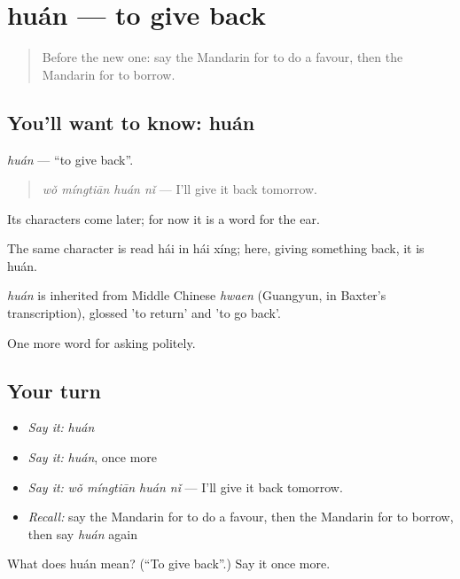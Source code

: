 \section[huán]{huán — to give back}

\label{lesson:ZH-C64-huan}



\begin{quote}
Before the new one: say the Mandarin for to do a favour, then the Mandarin for to borrow.
\end{quote}

\subsection*{You'll want to know: huán}
\emph{huán} — \textquotedblleft{}to give back\textquotedblright{}.

\begin{quote}
\emph{wǒ míngtiān huán nǐ} — I'll give it back tomorrow.
\end{quote}

Its characters come later; for now it is a word for the ear.

The same character is read hái in hái xíng; here, giving something back, it is huán.

\begin{cousinweb}
\emph{huán} is inherited from Middle Chinese \emph{hwaen} (Guangyun, in Baxter's transcription), glossed 'to return' and 'to go back'.
\end{cousinweb}

\begin{grammarlens}[title={What you've built}]
One more word for asking politely.
\end{grammarlens}

\subsection*{Your turn}
\begin{itemize}
\raggedright
  \item \emph{Say it:} \emph{huán}
  \item \emph{Say it:} \emph{huán}, once more
  \item \emph{Say it:} \emph{wǒ míngtiān huán nǐ} — I'll give it back tomorrow.
  \item \emph{Recall:} say the Mandarin for to do a favour, then the Mandarin for to borrow, then say \emph{huán} again
\end{itemize}

\begin{tcolorbox}[breakable,colback=teal!4,colframe=teal!35!black,title={Before you move on}]
What does huán mean? (\textquotedblleft{}To give back\textquotedblright{}.) Say it once more.
\end{tcolorbox}
